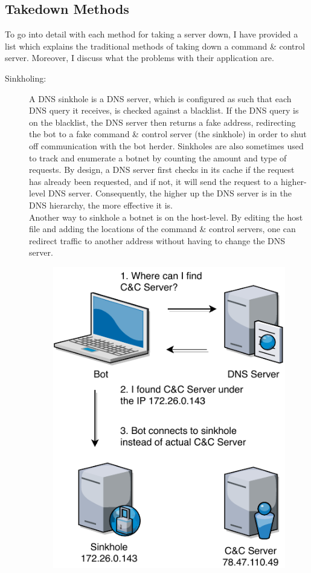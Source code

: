 \documentclass[10pt, a4paper, twocolumn]{article} %
\begin{document}
\subsection{Takedown Methods}\label{takedown}
To go into detail with each method for taking a server down, I have provided a list which explains the traditional methods of taking down a command \& control server. Moreover, I discuss what the problems with their application are.
\begin{description}

\item[Sinkholing:] \label{sinkhole}%
A DNS sinkhole is a DNS server, which is configured as such that each DNS query it receives, is checked against a blacklist. If the DNS query is on the blacklist, the DNS server then returns a fake address, redirecting the bot to a fake command \& control server (the sinkhole) in order to shut off communication with the bot herder. Sinkholes are also sometimes used to track and enumerate a botnet by counting the amount and type of requests. By design, a DNS server first checks in its cache if the request has already been requested, and if not, it will send the request to a higher-level DNS server. Consequently, the higher up the DNS server is in the DNS hierarchy, the more effective it is.\\
Another way to sinkhole a botnet is on the host-level. By editing the host file and adding the locations of the command \& control servers, one can redirect traffic to another address without having to change the DNS server.
\begin{figure}[ht]
  \centering
  \includegraphics[width=\linewidth]{figures/sinkhole}

\end{figure}
\end{description}
\end{document}
